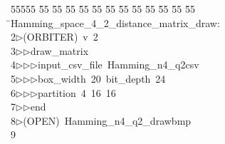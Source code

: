 %
%
\begin{tabbing}
55555 \= 55 \= 55 \= 55 \= 55 \= 55 \= 55 \= 55 \= 55 \= 55 \= 55 \= 55 \= 55 \= \>Hamming\_space\_4\_2\_distance\_matrix\_draw:\\[0pt]
2\>$\triangleright$\>(ORBITER)\ v\ 2\ \\[0pt]
3\>$\triangleright$\>$\triangleright$\>draw\_matrix\ \\[0pt]
4\>$\triangleright$\>$\triangleright$\>$\triangleright$\>input\_csv\_file\ Hamming\_n4\_q2csv\ \\[0pt]
5\>$\triangleright$\>$\triangleright$\>$\triangleright$\>box\_width\ 20\ bit\_depth\ 24\ \\[0pt]
6\>$\triangleright$\>$\triangleright$\>$\triangleright$\>partition\ 4\ 16\ 16\ \\[0pt]
7\>$\triangleright$\>$\triangleright$\>end\\[0pt]
8\>$\triangleright$\>(OPEN)\ Hamming\_n4\_q2\_drawbmp\\[0pt]
9\>\end{tabbing}
